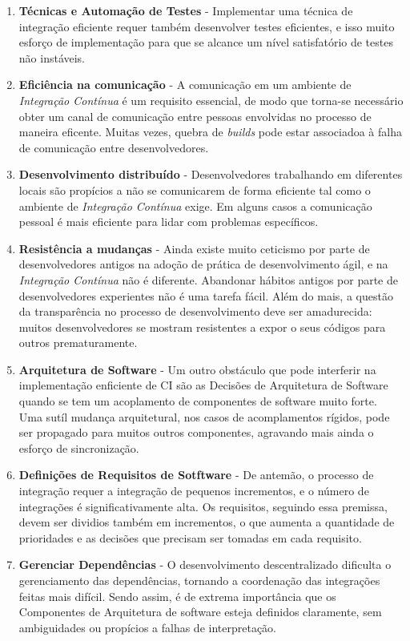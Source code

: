 \documentclass[11pt,oneside]{book}
\begin{document}
\begin{enumerate}

\item \textbf{Técnicas e Automação de Testes} - Implementar uma técnica de integração eficiente requer também desenvolver testes eficientes, e isso muito esforço de implementação para que se alcance um nível satisfatório de testes não instáveis. 

\item \textbf{Eficiência na comunicação} -
A comunicação em um ambiente de \emph{Integração Contínua} é um requisito essencial, de modo que torna-se necessário obter um canal de comunicação entre pessoas envolvidas no processo de maneira eficente. Muitas vezes, quebra de \emph{builds} pode estar associadoa à falha de comunicação entre desenvolvedores.

\item \textbf{Desenvolvimento distribuído} - Desenvolvedores trabalhando em diferentes locais são propícios a não se comunicarem de forma eficiente tal como o ambiente de \emph{Integração Contínua} exige. Em alguns casos a comunicação pessoal é mais eficiente para lidar com problemas específicos.

\item \textbf{Resistência a mudanças} - Ainda existe muito ceticismo por parte de desenvolvedores antigos na adoção de prática de desenvolvimento ágil, e na \emph{Integração Contínua} não é diferente. Abandonar hábitos antigos por parte de desenvolvedores experientes não é uma tarefa fácil. Além do mais, a questão da transparência no processo de desenvolvimento deve ser amadurecida: muitos desenvolvedores se mostram resistentes a expor o seus códigos para outros prematuramente.

\item \textbf{Arquitetura de Software} - Um outro obstáculo que pode interferir na implementação enficiente de CI são as Decisões de Arquitetura de Software quando se tem um acoplamento de componentes de software muito forte. Uma sutíl mudança arquitetural, nos casos de acomplamentos rígidos, pode ser propagado para muitos outros componentes, agravando mais ainda o esforço de sincronização.

\item \textbf{Definições de Requisitos de Sotftware} - De antemão, o processo de integração requer a integração de pequenos incrementos, e o número de integrações é significativamente alta. Os requisitos, seguindo essa premissa, devem ser dividios também em incrementos, o que aumenta a quantidade de prioridades e as decisões que precisam ser tomadas em cada requisito. 

\item \textbf{Gerenciar Dependências} - O desenvolvimento descentralizado dificulta o gerenciamento das dependências, tornando a coordenação das integrações feitas mais difícil. Sendo assim, é de extrema importância que os Componentes de Arquitetura de software esteja definidos claramente, sem ambiguidades ou propícios a falhas de interpretação. 



\end{enumerate}
\end{document}

